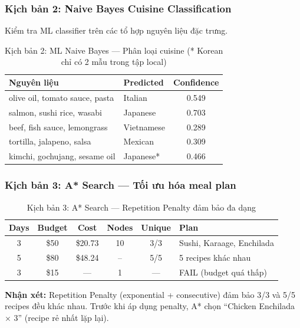 \subsubsection{Kịch bản 2: Naive Bayes Cuisine Classification}
Kiểm tra ML classifier trên các tổ hợp nguyên liệu đặc trưng.

\begin{table}[H]
\centering
\small
\begin{tabular}{|l|l|c|}
\hline
\textbf{Nguyên liệu} & \textbf{Predicted} & \textbf{Confidence} \\
\hline
olive oil, tomato sauce, pasta & Italian & 0.549 \\
\hline
salmon, sushi rice, wasabi & Japanese & 0.703 \\
\hline
beef, fish sauce, lemongrass & Vietnamese & 0.289 \\
\hline
tortilla, jalapeno, salsa & Mexican & 0.309 \\
\hline
kimchi, gochujang, sesame oil & Japanese* & 0.466 \\
\hline
\end{tabular}
\caption{Kịch bản 2: ML Naive Bayes --- Phân loại cuisine (* Korean chỉ có 2 mẫu trong tập local)}
\label{tab:exp_ml}
\end{table}

\subsubsection{Kịch bản 3: A* Search --- Tối ưu hóa meal plan}

\begin{table}[H]
\centering
\small
\begin{tabular}{|c|c|c|c|c|l|}
\hline
\textbf{Days} & \textbf{Budget} & \textbf{Cost} & \textbf{Nodes} & \textbf{Unique} & \textbf{Plan} \\
\hline
3 & \$50 & \$20.73 & 10 & 3/3 & Sushi, Karaage, Enchilada \\
\hline
5 & \$80 & \$48.24 & -- & 5/5 & 5 recipes khác nhau \\
\hline
3 & \$15 & --- & 1 & --- & FAIL (budget quá thấp) \\
\hline
\end{tabular}
\caption{Kịch bản 3: A* Search --- Repetition Penalty đảm bảo đa dạng}
\label{tab:exp_astar}
\end{table}

\textbf{Nhận xét:} Repetition Penalty (exponential + consecutive) đảm bảo 3/3 và 5/5 recipes đều khác nhau. Trước khi áp dụng penalty, A* chọn ``Chicken Enchilada $\times$ 3'' (recipe rẻ nhất lặp lại).

